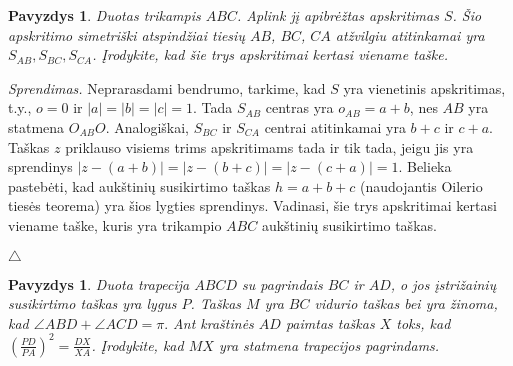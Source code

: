 \documentclass[11pt,a4paper,twoside]{book}
\newenvironment{sprendimas}{\noindent \textit{Sprendimas.}}{\hfill $\triangle$}
\newcounter{foo}[subsection]
\newtheorem{pavnr}[foo]{Pavyzdys}
\theoremstyle{definition} \newtheorem*{api}{Apibrėžimas}
\theoremstyle{remark} \newtheorem*{pastaba}{Pastaba}
\begin{document}
\begin{pavnr}
Duotas trikampis $ABC$. Aplink jį apibrėžtas apskritimas $S$. Šio apskritimo simetriški atspindžiai tiesių $AB$, $BC$, $CA$ atžvilgiu atitinkamai yra $S_{AB}, S_{BC}, S_{CA}$. Įrodykite, kad šie trys apskritimai kertasi viename taške.
\end{pavnr}
\begin{sprendimas}
Neprarasdami bendrumo, tarkime, kad $S$ yra vienetinis apskritimas, t.y., $o=0$ ir $|a|=|b|=|c|=1$. Tada $S_{AB}$ centras yra $o_{AB}=a+b$, nes $AB$ yra statmena $O_{AB}O$. Analogiškai, $S_{BC}$ ir $S_{CA}$ centrai atitinkamai yra $b+c$ ir $c+a$. Taškas $z$ priklauso visiems trims apskritimams tada ir tik tada, jeigu jis yra sprendinys $|z-(a+b)|=|z-(b+c)|=|z-(c+a)|=1$. Belieka pastebėti, kad aukštinių susikirtimo taškas $h=a+b+c$ (naudojantis Oilerio tiesės teorema) yra šios lygties sprendinys. Vadinasi, šie trys apskritimai kertasi viename taške, kuris yra trikampio $ABC$ aukštinių susikirtimo taškas.

\end{sprendimas}






\begin{pavnr}
Duota trapecija $ABCD$ su pagrindais $BC$ ir $AD$, o jos įstrižainių susikirtimo taškas yra lygus $P$. Taškas $M$ yra $BC$ vidurio taškas bei yra žinoma, kad $\angle ABD + \angle ACD = \pi.$ Ant kraštinės $AD$ paimtas taškas $X$ toks, kad $(\frac {PD}{PA})^2 = \frac {DX}{XA}$. Įrodykite, kad $MX$ yra statmena trapecijos pagrindams.
\end{pavnr}
\end{document}
